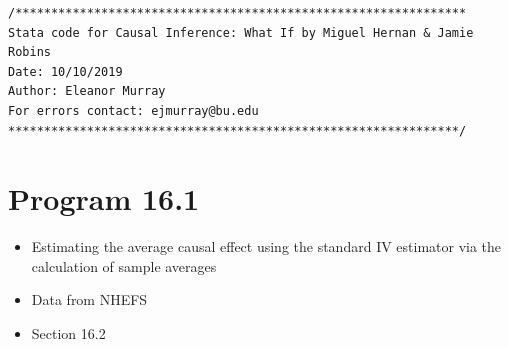 \documentclass[
  10pt,
]{book}
\providecommand{\tightlist}{%
  \setlength{\itemsep}{0pt}\setlength{\parskip}{0pt}}
\begin{document}
\begin{verbatim}
/***************************************************************
Stata code for Causal Inference: What If by Miguel Hernan & Jamie Robins
Date: 10/10/2019
Author: Eleanor Murray 
For errors contact: ejmurray@bu.edu
***************************************************************/
\end{verbatim}

\hypertarget{program-16.1}{%
\section{Program 16.1}\label{program-16.1}}

\begin{itemize}
\tightlist
\item
  Estimating the average causal effect using the standard IV estimator via the calculation of sample averages
\item
  Data from NHEFS
\item
  Section 16.2
\end{itemize}
\end{document}
